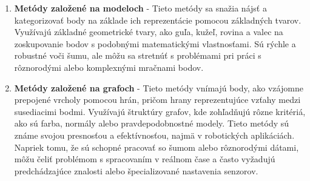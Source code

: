 \begin{enumerate}
 \item\textbf{Metódy založené na modeloch} - Tieto metódy sa snažia nájsť a kategorizovať body na základe ich reprezentácie pomocou základných tvarov. Využívajú základné geometrické tvary, ako guľa, kužeľ, rovina a valec na zoskupovanie bodov s podobnými matematickými vlastnosťami. Sú rýchle a robustné voči šumu, ale môžu sa stretnúť s problémami pri práci s rôznorodými alebo komplexnými mračnami bodov. \cite{ransac}
 \item\textbf{Metódy založené na grafoch} - Tieto metódy vnímajú body, ako vzájomne prepojené vrcholy pomocou hrán, pričom hrany reprezentujúce vzťahy medzi susediacimi bodmi. Využívajú štruktúry grafov, kde zohľadňujú rôzne kritériá, ako sú farba, normály alebo pravdepodobnostné modely. Tieto metódy sú známe svojou presnosťou a efektívnosťou, najmä v robotických aplikáciách. Napriek tomu, že sú schopné pracovať so šumom alebo rôznorodými dátami, môžu čeliť problémom s spracovaním v reálnom čase a často vyžadujú predchádzajúce znalosti alebo špecializované nastavenia senzorov. \cite{segmetation_survey}\cite{graph_based}
\end{enumerate}

